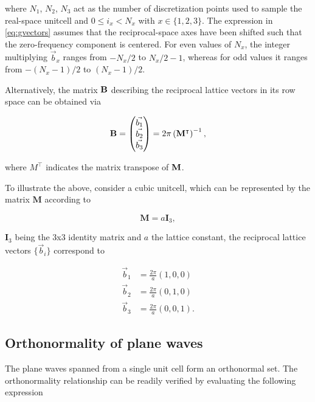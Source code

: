 where $N_{1}$, $N_{2}$, $N_{3}$ act as the number of discretization points used to sample the real-space unitcell and $0 \leq i_{x} < N_{x}$ with $x \in \{1,2,3\}$. The expression in \cref{eq:gvectors} assumes that the reciprocal-space axes have been shifted such that the zero-frequency component is centered. For even values of $N_x$, the integer multiplying $\vec{b}_x$ ranges from $-N_x/2$ to $N_x/2-1$, whereas for odd values it ranges from $-(N_x-1)/2$ to $(N_x-1)/2$.

Alternatively, the matrix $\mathbf{B}$ describing the reciprocal lattice vectors in its row space can be obtained via

\begin{equation}
    \mathbf{B} = \left(
    \begin{matrix}
        \vec{b_{1}}\\
        \vec{b_{2}}\\
        \vec{b_{3}}
    \end{matrix}
    \right) = 2 \pi \left( \mathbf{M}^{\intercal} \right)^{-1},
\end{equation}

where $M^{\intercal}$ indicates the matrix transpose of $\mathbf{M}$.

To illustrate the above, consider a cubic unitcell, which can be represented by the matrix $\mathbf{M}$ according to

\begin{equation}
    \mathbf{M} = a \mathbf{I}_{3},
\end{equation}

$\mathbf{I}_{3}$ being the 3x3 identity matrix and $a$ the lattice constant, the reciprocal lattice vectors $\{\vec{b}_{i}\}$ correspond to

\begin{align}
    \vec{b}_{1} &= \frac{2\pi}{a} \left(1,0,0\right) \\
    \vec{b}_{2} &= \frac{2\pi}{a} \left(0,1,0\right) \\
    \vec{b}_{3} &= \frac{2\pi}{a} \left(0,0,1\right).
\end{align}

%
%
%
\subsection{Orthonormality of plane waves}

The plane waves spanned from a single unit cell form an orthonormal set. The orthonormality relationship can be readily verified by evaluating the following expression


